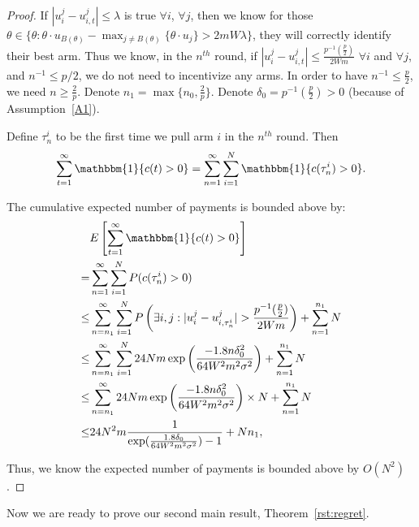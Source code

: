 \documentclass[twoside,11pt]{article}
\begin{document}
\begin{proof}
If $|u_{i}^{j}-u_{i,t}^{j}|\leq \lambda$ is true $\forall i$, $\forall j$, then we know for those $\theta\in \{\theta:\theta\cdot u_{B(\theta)}-\max_{j\neq B(\theta)}\{\theta \cdot u_{j}\}> 2mW\lambda\}$, they will correctly identify their best arm. Thus we know, in the $n^{th}$ round, if $|u_{i}^{j}-u_{i,t}^{j}|\leq \frac{p^{-1}(\frac{p}{2})}{2Wm}$ $\forall i$ and $\forall j$, and $n^{-1}\leq p/2$, we do not need to incentivize any arms. In order to have $n^{-1}\leq \frac{p}{2}$, we need $n\geq \frac{2}{p}$. Denote $n_1=\max\{n_{0}, \frac{2}{p}\}$. Denote $\delta_{0}=p^{-1}(\frac{p}{2})>0$ (because of Assumption~\ref{A1}).

Define $\tau_{n}^{i}$ to be the first time we pull arm $i$ in the $n^{th}$ round. Then
\begin{align}
\sum_{t=1}^{\infty}\mathbbm{1}\{c(t)>0\} =\sum_{n=1}^{\infty}\sum_{i=1}^{N}\mathbbm{1}\{c(\tau_{n}^{i})>0\}. \nonumber
\end{align}

The cumulative expected number of payments is bounded above by:
\begin{align}
&E\left[\sum_{t=1}^{\infty}\mathbbm{1}\{c(t)>0\}\right] \nonumber \\
=&\sum_{n=1}^{\infty}\sum_{i=1}^{N}P(c(\tau_{n}^{i})>0) \nonumber \\
\leq &\sum_{n=n_{1}}^{\infty}\sum_{i=1}^{N}P\left(\exists i,j:|u_{i}^{j}-u_{i,\tau_{n}^{i}}^{j}|>\frac{p^{-1}(\frac{p}{2})}{2Wm}\right)+\sum_{n=1}^{n_1}N \nonumber \\
\leq &\sum_{n=n_{1}}^{\infty}\sum_{i=1}^{N}24Nm \exp\left(\frac{-1.8 n\delta_{0}^2}{64W^2 m^2\sigma^2}\right) +\sum_{n=1}^{n_1}N \nonumber \\
\leq & \sum_{n=n_{1}}^{\infty}24Nm \exp\left(\frac{-1.8 n\delta_{0}^2}{64W^2 m^2\sigma^2}\right)\times N+\sum_{n=1}^{n_1}N \nonumber  \\
\leq&24N^2 m \frac{1}{\exp(\frac{1.8\delta_{0}}{64W^2 m^2\sigma^2})-1} + Nn_1, \nonumber
\end{align}

Thus, we know the expected number of payments is bounded above by $O(N^2)$.

\end{proof}


Now we are ready to prove our second main result, Theorem~\ref{rst:regret}.
\end{document}
